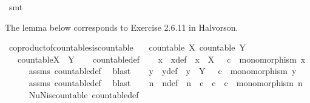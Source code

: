 \begin{isabellebody}
\ smt%
\endisatagproof
{\isafoldproof}%
%
\isadelimproof
%
\endisadelimproof
%
\begin{isamarkuptext}%
The lemma below corresponds to Exercise 2.6.11 in Halvorson.%
\end{isamarkuptext}\isamarkuptrue%
\isamarkupfalse%
\ coproduct{\isacharunderscore}{\kern0pt}of{\isacharunderscore}{\kern0pt}countables{\isacharunderscore}{\kern0pt}is{\isacharunderscore}{\kern0pt}countable{\isacharcolon}{\kern0pt}\isanewline
\ \ \ {\isachardoublequoteopen}countable\ X{\isachardoublequoteclose}\ {\isachardoublequoteopen}countable\ Y{\isachardoublequoteclose}\isanewline
\ \ \ {\isachardoublequoteopen}countable{\isacharparenleft}{\kern0pt}X\ {\isasymCoprod}\ Y{\isacharparenright}{\kern0pt}{\isachardoublequoteclose}\isanewline
%
\isadelimproof
\ \ %
\endisadelimproof
%
\isatagproof
{}\isamarkupfalse%
\ countable{\isacharunderscore}{\kern0pt}def\isanewline
{}\isamarkupfalse%
{\isacharminus}{\kern0pt}\isanewline
\ \ \isamarkupfalse%
\ x\ \ x{\isacharunderscore}{\kern0pt}def{\isacharcolon}{\kern0pt}\ \ {\isachardoublequoteopen}x\ {\isacharcolon}{\kern0pt}\ X\ \ {\isasymrightarrow}\ {\isasymnat}\isactrlsub c\ {\isasymand}\ monomorphism\ x{\isachardoublequoteclose}\isanewline
\ \ \ \ \isamarkupfalse%
\ assms{\isacharparenleft}{\kern0pt}{}{\isacharparenright}{\kern0pt}\ countable{\isacharunderscore}{\kern0pt}def\ \isamarkupfalse%
\ blast\isanewline
\ \ \isamarkupfalse%
\ y\ \ y{\isacharunderscore}{\kern0pt}def{\isacharcolon}{\kern0pt}\ \ {\isachardoublequoteopen}y\ {\isacharcolon}{\kern0pt}\ Y\ \ {\isasymrightarrow}\ {\isasymnat}\isactrlsub c\ {\isasymand}\ monomorphism\ y{\isachardoublequoteclose}\isanewline
\ \ \ \ \isamarkupfalse%
\ assms{\isacharparenleft}{\kern0pt}{}{\isacharparenright}{\kern0pt}\ countable{\isacharunderscore}{\kern0pt}def\ \isamarkupfalse%
\ blast\isanewline
\ \ \isamarkupfalse%
\ n\ \ n{\isacharunderscore}{\kern0pt}def{\isacharcolon}{\kern0pt}\ {\isachardoublequoteopen}\ n\ {\isacharcolon}{\kern0pt}\ {\isasymnat}\isactrlsub c\ {\isasymCoprod}\ {\isasymnat}\isactrlsub c\ {\isasymrightarrow}\ {\isasymnat}\isactrlsub c\ {\isasymand}\ monomorphism\ n{\isachardoublequoteclose}\isanewline
\ \ \ \ \isamarkupfalse%
\ NuN{\isacharunderscore}{\kern0pt}is{\isacharunderscore}{\kern0pt}countable\ countable{\isacharunderscore}{\kern0pt}def\ \isamarkupfalse%

\end{isabellebody}
